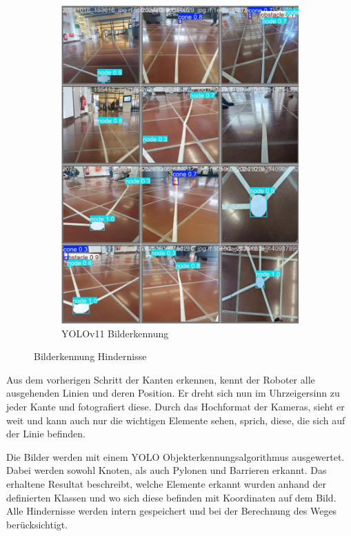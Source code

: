 \begin{figure}[H]
\begin{subfigure}{0.55\textwidth}
\includegraphics[width=\textwidth]{assets/informatik-prototyp/yolo/recognized-images.jpeg}
\caption{YOLOv11 Bilderkennung}
\label{fig:img-recognition-yolo-concept}
\end{subfigure}
\caption{Bilderkennung Hindernisse}
\label{fig:image-detection-obstacles}
\end{figure}

Aus dem vorherigen Schritt der Kanten erkennen, kennt der Roboter alle ausgehenden Linien und deren Position. Er dreht sich nun im Uhrzeigersinn zu jeder Kante und fotografiert diese. Durch das Hochformat der Kameras, sieht er weit und kann auch nur die wichtigen Elemente sehen, sprich, diese, die sich auf der Linie befinden.

Die Bilder werden mit einem YOLO Objekterkennungsalgorithmus ausgewertet. Dabei werden sowohl Knoten, als auch Pylonen und Barrieren erkannt. Das erhaltene Resultat beschreibt, welche Elemente erkannt wurden anhand der definierten Klassen und wo sich diese befinden mit Koordinaten auf dem Bild.
Alle Hindernisse werden intern gespeichert und bei der Berechnung des Weges berücksichtigt.


